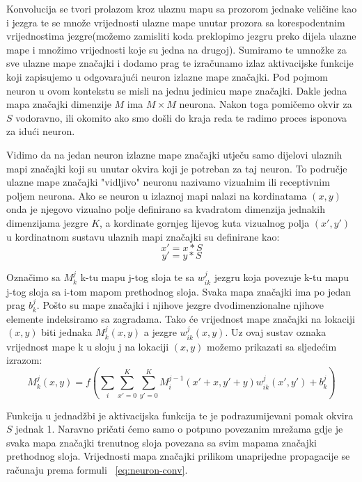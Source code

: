 \documentclass[times, utf8, zavrsni]{fer}
\begin{document}
Konvolucija se tvori prolazom kroz ulaznu mapu sa prozorom jednake veličine kao i jezgra te se množe vrijednosti ulazne mape unutar prozora sa korespodentnim vrijednostima jezgre(možemo zamisliti koda preklopimo jezgru preko dijela ulazne mape i množimo vrijednosti koje su jedna na drugoj). Sumiramo te umnožke za sve ulazne mape značajki i dodamo prag te izračunamo izlaz aktivacijske funkcije koji zapisujemo u odgovarajući neuron izlazne mape značajki. Pod pojmom neuron u ovom kontekstu se misli na jednu jedinicu mape značajki. Dakle jedna mapa značajki dimenzije $M$ ima $M \times M$ neurona. Nakon toga pomičemo okvir za $S$ vodoravno, ili okomito ako smo došli do kraja reda te radimo proces isponova za idući neuron.

Vidimo da na jedan neuron izlazne mape značajki utječu samo dijelovi ulaznih mapi značajki koji su unutar okvira koji je potreban za taj neuron. To područje ulazne mape značajki "vidljivo" neuronu nazivamo vizualnim ili receptivnim poljem neurona. Ako se neuron u izlaznoj mapi nalazi na kordinatama $(x, y)$ onda je njegovo vizualno polje definirano sa kvadratom dimenzija jednakih dimenzijama jezgre $K$, a kordinate gornjeg lijevog kuta vizualnog polja $(x', y')$ u kordinatnom sustavu ulaznih mapi značajki su definirane kao:
\begin{equation}
x' = x*S
\end{equation}
\begin{equation}
y' = y*S
\end{equation}

Označimo sa $M^j_k$ k-tu mapu j-tog sloja te sa $w^j_{ik}$ jezgru koja povezuje k-tu mapu j-tog sloja sa i-tom mapom prethodnog sloja. Svaka mapa značajki ima po jedan prag $b^j_k$. Pošto su mape značajki i njihove jezgre dvodimenzionalne njihove elemente indeksiramo sa zagradama. Tako će vrijednost mape značajki na lokaciji $(x, y)$ biti jednaka $M^j_k (x, y)$ a jezgre $w^j_{ik} (x, y)$. Uz ovaj sustav oznaka vrijednost mape k u sloju j na lokaciji $(x, y)$ možemo prikazati sa sljedećim izrazom:
\begin{equation}\label{eq:neuron-conv}
M^j_k (x, y) = f(\sum_i \sum_{x'=0}^K \sum_{y'=0}^K M^{j-1}_i (x' + x, y' + y) w^j_{ik} (x', y') + b^j_k )
\end{equation}

Funkcija u jednadžbi je aktivacijska funkcija te je podrazumijevani pomak okvira $S$ jednak 1. Naravno pričati ćemo samo o potpuno povezanim mrežama gdje je svaka mapa značajki trenutnog sloja povezana sa svim mapama značajki prethodnog sloja. Vrijednosti mapa značajki prilikom unaprijedne propagacije se računaju prema formuli ~\ref{eq:neuron-conv}.
\end{document}
